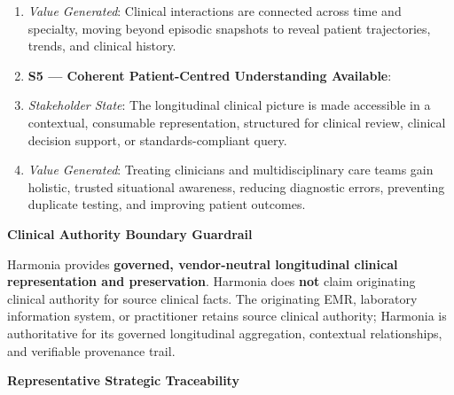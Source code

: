 \begin{enumerate}
\item \emph{Value Generated}: Clinical interactions are connected across time and specialty, moving beyond episodic snapshots to reveal patient trajectories, trends, and clinical history.

\item \textbf{S5 — Coherent Patient-Centred Understanding Available}:

\item \emph{Stakeholder State}: The longitudinal clinical picture is made accessible in a contextual, consumable representation, structured for clinical review, clinical decision support, or standards-compliant query.

\item \emph{Value Generated}: Treating clinicians and multidisciplinary care teams gain holistic, trusted situational awareness, reducing diagnostic errors, preventing duplicate testing, and improving patient outcomes.

\end{enumerate}


\par\medskip\textbf{Clinical Authority Boundary Guardrail}\par


Harmonia provides \textbf{governed, vendor-neutral longitudinal clinical representation and preservation}. Harmonia does \textbf{not} claim originating clinical authority for source clinical facts. The originating EMR, laboratory information system, or practitioner retains source clinical authority; Harmonia is authoritative for its governed longitudinal aggregation, contextual relationships, and verifiable provenance trail.



\par\medskip\textbf{Representative Strategic Traceability}\par


